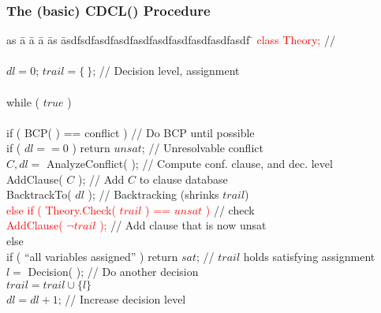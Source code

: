 \begin{frame}
  \frametitle{The (basic) CDCL(\T) Procedure}

  \scriptsize

  \vfill

  \begin{tabbing}
  as \= a \= a \= a \= as \= asdfsdfasdfasdfasdfasdfasdfasdfasdfasdf \= \kill
  \> \textcolor{red}{class {\sc Theory};}                         \> \> \> \> \> // \tsolver \\
  \\
  \> $dl = 0$; $trail = \{\ \}$;                                  \> \> \> \> \> // Decision level, assignment\\ \\
  \> while ( $true$ ) \\ \\
  \> \> if ( {\sc BCP}( ) == conflict )                                    \> \> \> \> // Do BCP until possible \\
  \> \> \> if ( $dl == 0$ ) return $unsat$;                             \> \> \> // Unresolvable conflict \\
  \> \> \> $C,dl =$ {\sc AnalyzeConflict}( );                           \> \> \> // Compute conf. clause, and dec. level \\
  \> \> \> {\sc AddClause}( $C$ );                                      \> \> \> // Add $C$ to clause database \\
  \> \> \> {\sc BacktrackTo}( $dl$ );                                   \> \> \> // Backtracking (shrinks $trail$) \\
  \> \> \textcolor{red}{else if ( {\sc Theory.Check}( $trail$ ) == $unsat$ )}               \> \> \> \> // \tsolver check \\
  \> \> \> \textcolor{red}{{\sc AddClause}( $\neg trail$ );}                             \> \> \> // Add clause that is now unsat \\
  \> \> else \\
  \> \> \> if ( ``all variables assigned'' ) return $sat$;              \> \> \> // $trail$ holds satisfying assignment \\
  \> \> \> $l = $ {\sc Decision}( );                                    \> \> \> // Do another decision \\
  \> \> \> $trail = trail \cup \{ l \}$ \\                          
  \> \> \> $dl = dl + 1$;                                               \> \> \> // Increase decision level \\
  \end{tabbing}

  \vfill

\end{frame}
